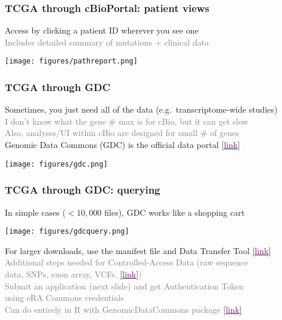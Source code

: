\documentclass{beamer}
\newcommand{\si}[1]{\hspace{.5cm} \textcolor{gray} {#1}\\}
\newcommand{\sicont}[1]{\hspace{1cm} \textcolor{gray} {#1}\\}
\newcommand{\cref}[1]{\href{#1}{[\textcolor{purple}{link}]}}
\begin{document}
{\begin{frame}[t]
\frametitle{TCGA through cBioPortal: patient views}
Access by clicking a patient ID wherever you see one\\
\si{Includes detailed summary of mutations + clinical data}
\begin{center}
\texttt{[image: figures/pathreport.png]}
\end{center}
\end{frame}

\begin{frame}[t]
\frametitle{TCGA through GDC}
Sometimes, you just need all of the data (e.g.\ transcriptome-wide studies)\\
\si{I don't know what the gene \# max is for cBio, but it can get slow}
\si{Also, analyses/UI within cBio are designed for small \# of genes}
\vspace{.2cm}
Genomic Data Commons (GDC) is the official data portal \cref{https://portal.gdc.cancer.gov/}\\
\begin{center}
\texttt{[image: figures/gdc.png]}
\end{center}
\end{frame}

\begin{frame}[t]
\frametitle{TCGA through GDC: querying}
In simple cases ($<10,\!000$ files), GDC works like a shopping cart\\
\begin{center}
\texttt{[image: figures/gdcquery.png]}
\end{center}
For larger downloads, use the manifest file and Data Transfer Tool \cref{https://docs.gdc.cancer.gov/Data_Transfer_Tool/Users_Guide/Data_Download_and_Upload/}\\
\si{Additional steps needed for Controlled-Access Data (raw sequence}
\sicont{data, SNPs, exon array, VCFs, \cref{https://cancergenome.nih.gov/abouttcga/aboutdata/accesstiers})}
\si{Submit an application (next slide) and get Authentication Token}
\sicont{using eRA Commons credentials}
\si{Can do entirely in R with GenomicDataCommons package \cref{https://github.com/Bioconductor/GenomicDataCommons}}
\end{frame}

}
\end{document}
